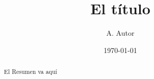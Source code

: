 \documentclass{article}
\title{El t\'itulo}
\author{A. Autor}
\date{\today}
\begin{document}
\maketitle

\begin{abstract}
El Resumen va aqu\'i
\end{abstract}
\end{document}
